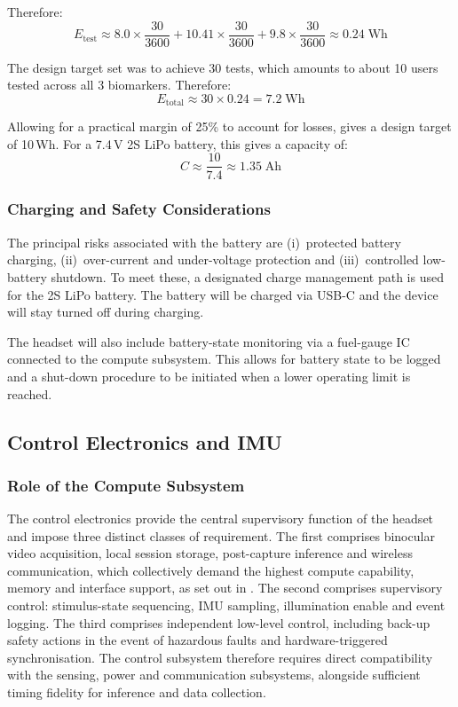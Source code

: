 Therefore:
%
\begin{equation}
    E_{\text{test}} \approx 8.0 \times \frac{30}{3600} + 10.41 \times \frac{30}{3600} + 9.8 \times \frac{30}{3600} \approx 0.24 \; \text{Wh}
\end{equation}

The design target set was to achieve 30 tests, which amounts to about 10 users tested across all 3 biomarkers. Therefore:
%
\begin{equation}
    E_{\text{total}} \approx 30 \times 0.24 = 7.2 \; \text{Wh}
\end{equation}

Allowing for a practical margin of 25\% to account for losses, gives a design target of 10\,Wh. For a 7.4\,V 2S LiPo battery, this gives a capacity of:
%
\begin{equation}
    C \approx \frac{10}{7.4} \approx 1.35 \; \text{Ah}
\end{equation}

\subsubsection{Charging and Safety Considerations}

The principal risks associated with the battery are (i)~protected battery charging, (ii)~over-current and under-voltage protection and (iii)~controlled low-battery shutdown. To meet these, a designated charge management path is used for the 2S LiPo battery. The battery will be charged via USB-C and the device will stay turned off during charging.

The headset will also include battery-state monitoring via a fuel-gauge IC connected to the compute subsystem. This allows for battery state to be logged and a shut-down procedure to be initiated when a lower operating limit is reached.


\subsection{Control Electronics and IMU}

\subsubsection{Role of the Compute Subsystem}

The control electronics provide the central supervisory function of the headset and impose three distinct classes of requirement. The first comprises binocular video acquisition, local session storage, post-capture inference and wireless communication, which collectively demand the highest compute capability, memory and interface support, as set out in . The second comprises supervisory control: stimulus-state sequencing, IMU sampling, illumination enable and event logging. The third comprises independent low-level control, including back-up safety actions in the event of hazardous faults and hardware-triggered synchronisation. The control subsystem therefore requires direct compatibility with the sensing, power and communication subsystems, alongside sufficient timing fidelity for inference and data collection.

